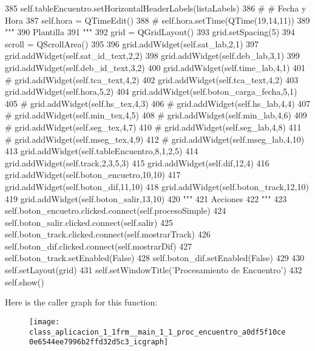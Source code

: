 \begin{DoxyCode}
385         self.tableEncuentro.setHorizontalHeaderLabels(listaLabels)      
386 #       # Fecha y Hora
387         self.hora = QTimeEdit()
388 #       self.hora.setTime(QTime(19,14,11))
389         """
390         Plantilla
391         """
392         grid = QGridLayout()
393         grid.setSpacing(5)
394         scroll = QScrollArea()
395 
396         grid.addWidget(self.sat_lab,2,1)
397         grid.addWidget(self.sat_id_text,2,2)
398         grid.addWidget(self.deb_lab,3,1)
399         grid.addWidget(self.deb_id_text,3,2)
400         grid.addWidget(self.time_lab,4,1)
401 #        grid.addWidget(self.tca_text,4,2)
402         grid.addWidget(self.tca_text,4,2)
403         grid.addWidget(self.hora,5,2)
404         grid.addWidget(self.boton_carga_fecha,5,1)
405 #         grid.addWidget(self.hs_tex,4,3)
406 #         grid.addWidget(self.hs_lab,4,4)
407 #         grid.addWidget(self.min_tex,4,5)
408 #         grid.addWidget(self.min_lab,4,6)
409 #         grid.addWidget(self.seg_tex,4,7)
410 #         grid.addWidget(self.seg_lab,4,8)
411 #         grid.addWidget(self.mseg_tex,4,9)
412 #         grid.addWidget(self.mseg_lab,4,10)        
413         grid.addWidget(self.tableEncuentro,8,1,2,5)
414         grid.addWidget(self.track,2,3,5,3)
415         grid.addWidget(self.dif,12,4)
416         grid.addWidget(self.boton_encuetro,10,10)
417         grid.addWidget(self.boton_dif,11,10)
418         grid.addWidget(self.boton_track,12,10)
419         grid.addWidget(self.boton_salir,13,10)
420         """
421         Acciones
422         """
423         self.boton_encuetro.clicked.connect(self.procesoSimple)
424         self.boton_salir.clicked.connect(self.salir)
425         self.boton_track.clicked.connect(self.mostrarTrack)
426         self.boton_dif.clicked.connect(self.mostrarDif)
427         self.boton_track.setEnabled(False)
428         self.boton_dif.setEnabled(False)
429 
430         self.setLayout(grid)
431         self.setWindowTitle('Procesamiento de Encuentro')    
432         self.show()

\end{DoxyCode}


\-Here is the caller graph for this function\-:\nopagebreak
\begin{figure}[H]
\begin{center}
\leavevmode
\texttt{[image: class\_aplicacion\_1\_1frm\_\_main\_1\_1\_proc\_encuentro\_a0df5f10ce0e6544ee7996b2ffd32d5c3\_icgraph]}
\end{center}
\end{figure}


